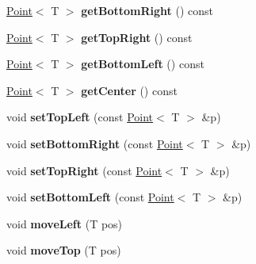 \begin{DoxyCompactItemize}
\item 
\hypertarget{class_box_a1cbff4ee05e798b43cda5ca603d004e7}{
\hyperlink{class_point}{Point}$<$ T $>$ {\bfseries getBottomRight} () const }
\label{class_box_a1cbff4ee05e798b43cda5ca603d004e7}

\item 
\hypertarget{class_box_a61afdde64f205f189aeff219bac2db24}{
\hyperlink{class_point}{Point}$<$ T $>$ {\bfseries getTopRight} () const }
\label{class_box_a61afdde64f205f189aeff219bac2db24}

\item 
\hypertarget{class_box_a0e7e1c5254740268ba77c9a0b27a4f06}{
\hyperlink{class_point}{Point}$<$ T $>$ {\bfseries getBottomLeft} () const }
\label{class_box_a0e7e1c5254740268ba77c9a0b27a4f06}

\item 
\hypertarget{class_box_a79994cde311637abfa037fed82144376}{
\hyperlink{class_point}{Point}$<$ T $>$ {\bfseries getCenter} () const }
\label{class_box_a79994cde311637abfa037fed82144376}

\item 
\hypertarget{class_box_ae155e4095a60d21cdd3677e018ef25c9}{
void {\bfseries setTopLeft} (const \hyperlink{class_point}{Point}$<$ T $>$ \&p)}
\label{class_box_ae155e4095a60d21cdd3677e018ef25c9}

\item 
\hypertarget{class_box_adbec284811aeec462e064a28f7aaaa8c}{
void {\bfseries setBottomRight} (const \hyperlink{class_point}{Point}$<$ T $>$ \&p)}
\label{class_box_adbec284811aeec462e064a28f7aaaa8c}

\item 
\hypertarget{class_box_a87df2c9be2d8d144df1e47e1150b9132}{
void {\bfseries setTopRight} (const \hyperlink{class_point}{Point}$<$ T $>$ \&p)}
\label{class_box_a87df2c9be2d8d144df1e47e1150b9132}

\item 
\hypertarget{class_box_a228cf7f5dcfd1013b647d524a4ce5148}{
void {\bfseries setBottomLeft} (const \hyperlink{class_point}{Point}$<$ T $>$ \&p)}
\label{class_box_a228cf7f5dcfd1013b647d524a4ce5148}

\item 
\hypertarget{class_box_aa656edcbbfa8c22092bc2928e792db93}{
void {\bfseries moveLeft} (T pos)}
\label{class_box_aa656edcbbfa8c22092bc2928e792db93}

\item 
\hypertarget{class_box_a082c2eb93743c2bb2e8d2873a110bdb6}{
void {\bfseries moveTop} (T pos)}
\label{class_box_a082c2eb93743c2bb2e8d2873a110bdb6}


\end{DoxyCompactItemize}

